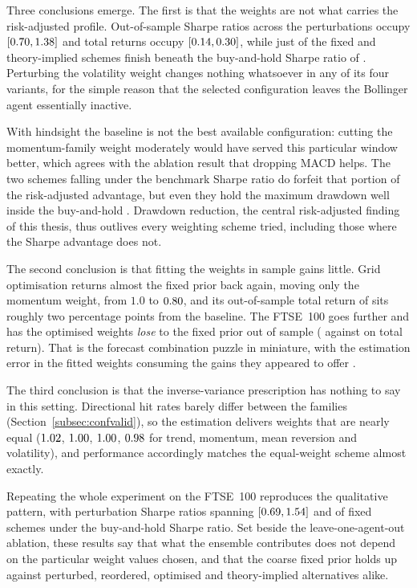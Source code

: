 Three conclusions emerge. The first is that the weights are not what carries the risk-adjusted profile. Out-of-sample Sharpe ratios across the \WSPerturbN{} perturbations occupy $[0.70{}, 1.38{}]$ and total returns occupy $[0.14{}, 0.30{}]$, while just \WSFixedBelowBH{} of the \WSFixedN{} fixed and theory-implied schemes finish beneath the buy-and-hold Sharpe ratio of \BHsharpe{}. Perturbing the volatility weight changes nothing whatsoever in any of its four variants, for the simple reason that the selected configuration leaves the Bollinger agent essentially inactive.

With hindsight the baseline is not the best available configuration: cutting the momentum-family weight moderately would have served this particular window better, which agrees with the ablation result that dropping MACD helps. The two schemes falling under the benchmark Sharpe ratio do forfeit that portion of the risk-adjusted advantage, but even they hold the maximum drawdown well inside the buy-and-hold \MDDbh{}. Drawdown reduction, the central risk-adjusted finding of this thesis, thus outlives every weighting scheme tried, including those where the Sharpe advantage does not.

The second conclusion is that fitting the weights in sample gains little. Grid optimisation returns almost the fixed prior back again, moving only the momentum weight, from $1.0$ to $0.80{}$, and its out-of-sample total return of \WSOptTR{} sits roughly two percentage points from the baseline. The FTSE~100 goes further and has the optimised weights \emph{lose} to the fixed prior out of sample (\FtseWSOptTR{} against \FtseTRtest{} on total return). That is the forecast combination puzzle in miniature, with the estimation error in the fitted weights consuming the gains they appeared to offer \cite{smithwallis2009,claeskens2016}.

The third conclusion is that the inverse-variance prescription has nothing to say in this setting. Directional hit rates barely differ between the families (Section~\ref{subsec:confvalid}), so the estimation delivers weights that are nearly equal ($1.02{}$, $1.00{}$, $1.00{}$, $0.98{}$ for trend, momentum, mean reversion and volatility), and performance accordingly matches the equal-weight scheme almost exactly.

Repeating the whole experiment on the FTSE~100 reproduces the qualitative pattern, with perturbation Sharpe ratios spanning $[0.69{}, 1.54{}]$ and \FtseWSFixedBelowBH{} of \FtseWSFixedN{} fixed schemes under the buy-and-hold Sharpe ratio. Set beside the leave-one-agent-out ablation, these results say that what the ensemble contributes does not depend on the particular weight values chosen, and that the coarse fixed prior holds up against perturbed, reordered, optimised and theory-implied alternatives alike.

